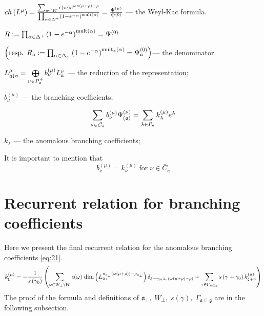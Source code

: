 \documentclass[a4paper,12pt]{article}
\theoremstyle{definition} \newtheorem{Def}{Definition}
\begin{document}
$ch\left( L^{\mu }\right) =\frac{\sum_{w\in W}\epsilon (w)e^{w\circ (\mu
+\rho )-\rho }}{\prod_{\alpha \in \Delta ^{+}}\left( 1-e^{-\alpha }\right) ^{%
\mathrm{{mult}\left( \alpha \right) }}}=\frac{\Psi ^{\left( \mu \right) }}{%
\Psi ^{\left( 0\right) }}$ --- the Weyl-Kac formula.

$R:=\prod_{\alpha \in \Delta ^{+}}\left( 1-e^{-\alpha }\right) ^{\mathrm{{%
mult}\left( \alpha \right) }}=\Psi ^{\left( 0\right) }\quad $

\noindent $\left( \text{resp. }R_{\frak{a}}:=\prod_{\alpha \in \Delta _{%
\frak{a}}^{+}}\left( 1-e^{-\alpha }\right) ^{\mathrm{mult}_{\frak{a}}\mathrm{%
\left( \alpha \right) }}=\Psi _{\frak{a}}^{\left( 0\right) }\right) $--- the
denominator.

$  L_{\frak{g}\downarrow \frak{a}}^{\mu }=\bigoplus\limits_{\nu \in P_{\frak{a}}^{+}}b_{\nu }^{\left( \mu \right) }L_{\frak{a}}^{\nu }$ --- the reduction of the representation;


$b^{(\mu)}_{\nu}$ --- the branching coefficients;

\begin{equation}
  \label{eq:21}
  \sum_{\nu \in \bar{C_{\mathfrak{a}}}}b_{\nu }^{\left( \mu \right) }\Psi _{\left( \frak{%
        a}\right) }^{\left( \nu \right) }=\sum_{\lambda \in P_{\frak{a}}}k_{\lambda
  }^{\left( \mu \right) }e^{\lambda } 
\end{equation}

 $k_{\lambda}$ --- the anomalous branching coefficients;

It is important to mention that
\begin{equation}
  \label{eq:20}
  b^{(\mu)}_{\nu}=k^{(\mu)}_{\nu} \; \mbox{for} \; \nu\in \bar{C}_{\mathfrak{a}}
\end{equation}

\section{Recurrent relation for branching coefficients}
\label{sec:recurr-form-branch}

Here we present the final recurrent relation for the anomalous branching coefficients \eqref{eq:21}. 
\begin{equation}
  \label{eq:1}
k_{\xi }^{\left( \mu \right) }=-\frac{1}{s\left( \gamma _{0}\right) }\left(
  \sum_{\omega\in W_{\bot}\backslash W} \epsilon(\omega)\; {\rm dim}\left(L^{\pi_{\mathfrak{a}_{\bot}}(\omega(\mu+\rho))-\rho_{\mathfrak{a}_{\bot}}}_{\mathfrak{a}_{\bot}}\right) \delta_{\xi-\gamma_0,\pi_{\mathfrak{a}}(\omega(\mu+\rho)-\rho)}+
\sum_{\gamma \in
\Gamma _{\frak{a}\subset \frak{g}}}s\left( \gamma +\gamma _{0}\right) k_{\xi
+\gamma }^{\left( \mu \right) }\right)   
\end{equation}
The proof of the formula and definitions of $\mathfrak{a}_{\bot},\; W_{\bot},\; s(\gamma),\; \Gamma_{\mathfrak{a}\subset \mathfrak{g}}$ are in the following subsection.
\end{document}
